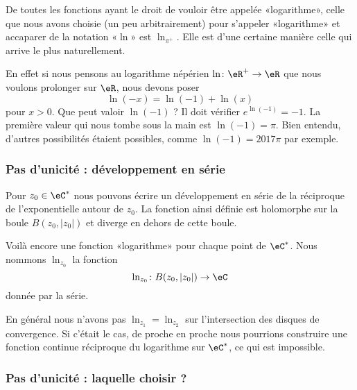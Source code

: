 De toutes les fonctions ayant le droit de vouloir être appelée «logarithme», celle que nous avons choisie (un peu arbitrairement) pour s'appeler «logarithme» et accaparer de la notation «\( \ln\)» est \( \ln_{\pi^+}\). Elle est d'une certaine manière celle qui arrive le plus naturellement.

En effet si nous pensons au logarithme népérien \( \ln\colon \eR^+\to \eR\) que nous voulons prolonger sur \( \eR\), nous devons poser
\begin{equation}
	\ln(-x)=\ln(-1)+\ln(x)
\end{equation}
pour \( x>0\). Que peut valoir \( \ln(-1)\) ? Il doit vérifier \(  e^{\ln(-1)}=-1\). La première valeur qui nous tombe sous la main est \( \ln(-1)=\pi\). Bien entendu, d'autres possibilités étaient possibles, comme \( \ln(-1)=2017\pi\) par exemple.

\subsubsection{Pas d'unicité : développement en série}

Pour \( z_0\in \eC^*\) nous pouvons écrire un développement en série de la réciproque de l'exponentielle autour de \( z_0\). La fonction ainsi définie est holomorphe sur la boule \( B(z_0,| z_0 |)\) et diverge en dehors de cette boule.

Voilà encore une fonction «logarithme» pour chaque point de \( \eC^*\). Nous nommons \( \ln_{z_0}\) la fonction
\begin{equation}
	\ln_{z_0}\colon B(z_0,| z_0 |)\to \eC
\end{equation}
donnée par la série.

En général nous n'avons pas \( \ln_{z_1}=\ln_{z_2}\) sur l'intersection des disques de convergence. Si c'était le cas, de proche en proche nous pourrions construire une fonction continue réciproque du logarithme sur \( \eC^*\), ce qui est impossible.

\subsubsection{Pas d'unicité : laquelle choisir ?}


